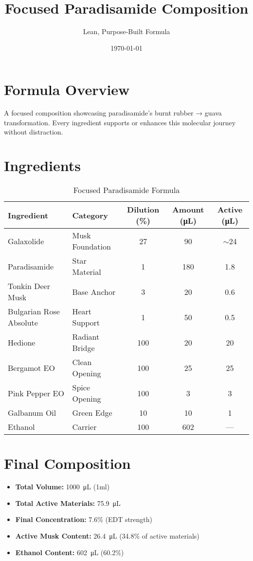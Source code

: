\documentclass{article}
\title{Focused Paradisamide Composition}
\author{Lean, Purpose-Built Formula}
\date{\today}
\begin{document}
\maketitle

\section{Formula Overview}
A focused composition showcasing paradisamide's burnt rubber → guava transformation. Every ingredient supports or enhances this molecular journey without distraction.

\section{Ingredients}

\begin{table}[h]
\centering
\begin{tabular}{@{}llccc@{}}
\toprule
\textbf{Ingredient} & \textbf{Category} & \textbf{Dilution (\%)} & \textbf{Amount (\si{\micro\liter})} & \textbf{Active (\si{\micro\liter})} \\
\midrule
Galaxolide & Musk Foundation & 27 & 90 & $\sim$24 \\
Paradisamide & Star Material & 1 & 180 & 1.8 \\
Tonkin Deer Musk & Base Anchor & 3 & 20 & 0.6 \\
Bulgarian Rose Absolute & Heart Support & 1 & 50 & 0.5 \\
Hedione & Radiant Bridge & 100 & 20 & 20 \\
Bergamot EO & Clean Opening & 100 & 25 & 25 \\
Pink Pepper EO & Spice Opening & 100 & 3 & 3 \\
Galbanum Oil & Green Edge & 10 & 10 & 1 \\
Ethanol & Carrier & 100 & 602 & --- \\
\bottomrule
\end{tabular}
\caption{Focused Paradisamide Formula}
\end{table}

\section{Final Composition}
\begin{itemize}
\item \textbf{Total Volume:} \SI{1000}{\micro\liter} (1ml)
\item \textbf{Total Active Materials:} \SI{75.9}{\micro\liter}
\item \textbf{Final Concentration:} 7.6\% (EDT strength)
\item \textbf{Active Musk Content:} \SI{26.4}{\micro\liter} (34.8\% of active materials)
\item \textbf{Ethanol Content:} \SI{602}{\micro\liter} (60.2\%)
\end{itemize}
\end{document}
